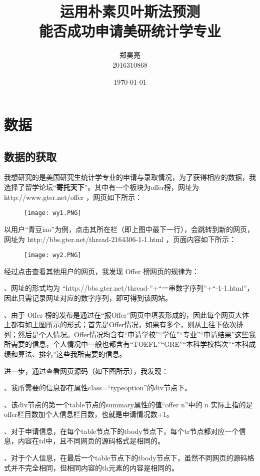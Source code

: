\documentclass[UTF8,cs4size]{ctexart}
\title{\heiti 运用朴素贝叶斯法预测\\能否成功申请美研统计学专业}
\author{\zihao{3}郑昊亮 \\ \zihao{3}2016310868}
\date{\zihao{3}\today}%
\begin{document}
\maketitle
\vspace{4em}%
\thispagestyle{empty}


\clearpage%


\setcounter{page}{1}
\section{\heiti 数据}
\subsection{\heiti 数据的获取}
\par 我想研究的是美国研究生统计学专业的申请与录取情况，为了获得相应的数据，我选择了留学论坛“\textbf{寄托天下}”。其中有一个板块为offer榜，网址为 http://www.gter.net/offer ，网页如下所示：
\begin{figure}[h]
	\centering
	\texttt{[image: wy1.PNG]}
\end{figure}
\par 以用户“青豆iao”为例，点击其所在栏（即上图中最下一行），会跳转到新的网页，网址为 http://bbs.gter.net/thread-2164306-1-1.html ，页面内容如下所示：
\begin{figure}[h]
	\centering
	\texttt{[image: wy2.PNG]}
\end{figure}
\par 经过点击查看其他用户的网页，我发现 Offer 榜网页的规律为：
{ 
\par {}、网址的形式均为 “http://bbs.gter.net/thread-”+“一串数字序列”+“-1-1.html”，因此只需记录网址对应的数字序列，即可得到该网站。 
\par {}、由于 Offer 榜的发布是通过在“报Offer”网页中填表形成的，因此每个网页大体上都有如上图所示的形式；首先是Offer情况，如果有多个，则从上往下依次排列；然后是个人情况。Offer情况均含有“申请学校”“学位”“专业”“申请结果”这些我所需要的信息，个人情况中一般也都含有“TOEFL”“GRE”“本科学校档次”“本科成绩和算法、排名”这些我所需要的信息。}

\par 进一步，通过查看网页源码（如下图所示），我发现：
{ 
\par {}、我所需要的信息都在属性class=“typeoption”的div节点下。
\par {}、该div节点的第一个table节点的summary属性的值“offer n”中的 n 实际上指的是offer栏目数加个人信息栏目数，也就是申请情况数+1。
\par {}、对于申请信息，在每个table节点下的tbody节点下，每个tr节点都对应一个信息，内容在td中，且不同网页的源码格式是相同的。
\par {}、对于个人信息，在最后一个table节点下的tbody节点下，虽然不同网页的源码格式并不完全相同，但相同内容的th元素的内容是相同的。}
\end{document}
